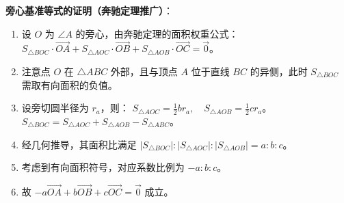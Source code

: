 \begin{proofbox}
\textbf{旁心基准等式的证明（奔驰定理推广）}：
\begin{enumerate}
    \item 设 $O$ 为 $\angle A$ 的旁心，由奔驰定理的面积权重公式：
    $S_{\triangle BOC} \cdot \vec{OA} + S_{\triangle AOC} \cdot \vec{OB} + S_{\triangle AOB} \cdot \vec{OC} = \vec{0}$。
    \item 注意点 $O$ 在 $\triangle ABC$ 外部，且与顶点 $A$ 位于直线 $BC$ 的异侧，此时 $S_{\triangle BOC}$ 需取有向面积的负值。
    \item 设旁切圆半径为 $r_a$，则：
    $S_{\triangle AOC} = \frac{1}{2} b r_a, \quad S_{\triangle AOB} = \frac{1}{2} c r_a$。
    $S_{\triangle BOC} = S_{\triangle AOC} + S_{\triangle AOB} - S_{\triangle ABC}$。
    \item 经几何推导，其面积比满足 $|S_{\triangle BOC}| : |S_{\triangle AOC}| : |S_{\triangle AOB}| = a : b : c$。
    \item 考虑到有向面积符号，对应系数比例为 $-a : b : c$。
    \item 故 $-a\vec{OA} + b\vec{OB} + c\vec{OC} = \vec{0}$ 成立。
\end{enumerate}
\end{proofbox}